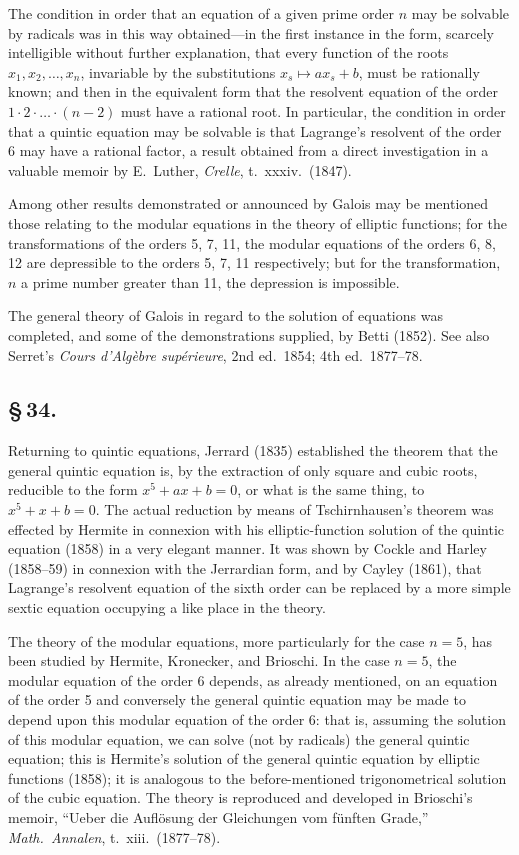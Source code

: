 \documentclass[11pt,a4paper]{book}
\begin{document}
The condition in order that an equation of a given prime order $n$ may be solvable by radicals was in this way obtained---in the first instance in the form, scarcely intelligible without further explanation, that every function of the roots $x_{1}, x_{2}, \ldots, x_{n}$, invariable by the substitutions $x_{s} \mapsto ax_{s} + b$, must be rationally known; and then in the equivalent form that the resolvent equation of the order $1 \cdot 2 \cdot \ldots \cdot (n - 2)$ must have a rational root. In particular, the condition in order that a quintic equation may be solvable is that Lagrange's resolvent of the order 6 may have a rational factor, a result obtained from a direct investigation in a valuable memoir by E.\ Luther, \textit{Crelle}, t.~xxxiv.\ (1847).

Among other results demonstrated or announced by Galois may be mentioned those relating to the modular equations in the theory of elliptic functions; for the transformations of the orders 5, 7, 11, the modular equations of the orders 6, 8, 12 are depressible to the orders 5, 7, 11 respectively; but for the transformation, $n$ a prime number greater than 11, the depression is impossible.

The general theory of Galois in regard to the solution of equations was completed, and some of the demonstrations supplied, by Betti (1852). See also Serret's \textit{Cours d'Alg\`{e}bre sup\'{e}rieure}, 2nd ed.\ 1854; 4th ed.\ 1877--78.

\subsection*{\S\,34.}

Returning to quintic equations, Jerrard (1835) established the theorem that the general quintic equation is, by the extraction of only square and cubic roots, reducible to the form $x^{5} + ax + b = 0$, or what is the same thing, to $x^{5} + x + b = 0$. The actual reduction by means of Tschirnhausen's theorem was effected by Hermite in connexion with his elliptic-function solution of the quintic equation (1858) in a very elegant manner. It was shown by Cockle and Harley (1858--59) in connexion with the Jerrardian form, and by Cayley (1861), that Lagrange's resolvent equation of the sixth order can be replaced by a more simple sextic equation occupying a like place in the theory.

The theory of the modular equations, more particularly for the case $n = 5$, has been studied by Hermite, Kronecker, and Brioschi. In the case $n = 5$, the modular equation of the order 6 depends, as already mentioned, on an equation of the order 5 and conversely the general quintic equation may be made to depend upon this modular equation of the order 6: that is, assuming the solution of this modular equation, we can solve (not by radicals) the general quintic equation; this is Hermite's solution of the general quintic equation by elliptic functions (1858); it is analogous to the before-mentioned trigonometrical solution of the cubic equation. The theory is reproduced and developed in Brioschi's memoir, ``Ueber die Aufl\"{o}sung der Gleichungen vom f\"{u}nften Grade,'' \textit{Math.\ Annalen}, t.~xiii.\ (1877--78).
\end{document}
